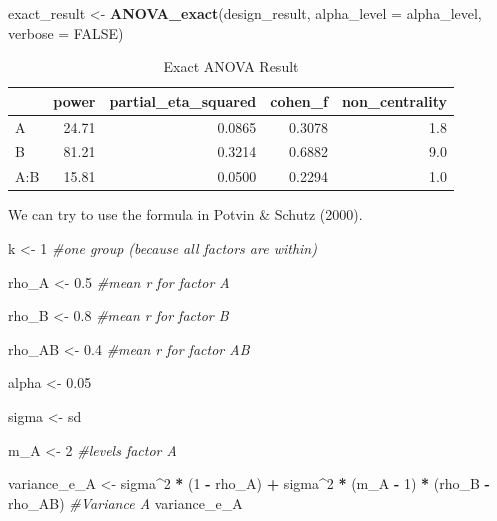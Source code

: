 \documentclass[]{book}
\newenvironment{Shaded}{\begin{snugshade}}{\end{snugshade}}
\newcommand{\CommentTok}[1]{\textcolor[rgb]{0.56,0.35,0.01}{\textit{#1}}}
\newcommand{\DataTypeTok}[1]{\textcolor[rgb]{0.13,0.29,0.53}{#1}}
\newcommand{\DecValTok}[1]{\textcolor[rgb]{0.00,0.00,0.81}{#1}}
\newcommand{\FloatTok}[1]{\textcolor[rgb]{0.00,0.00,0.81}{#1}}
\newcommand{\KeywordTok}[1]{\textcolor[rgb]{0.13,0.29,0.53}{\textbf{#1}}}
\newcommand{\NormalTok}[1]{#1}
\newcommand{\OperatorTok}[1]{\textcolor[rgb]{0.81,0.36,0.00}{\textbf{#1}}}
\newcommand{\OtherTok}[1]{\textcolor[rgb]{0.56,0.35,0.01}{#1}}
\newcommand{\StringTok}[1]{\textcolor[rgb]{0.31,0.60,0.02}{#1}}
\begin{document}
\begin{Shaded}
\begin{Highlighting}[]
\NormalTok{exact_result <-}\StringTok{ }\KeywordTok{ANOVA_exact}\NormalTok{(design_result,}
                            \DataTypeTok{alpha_level =}\NormalTok{ alpha_level,}
                            \DataTypeTok{verbose =} \OtherTok{FALSE}\NormalTok{)}
\end{Highlighting}
\end{Shaded}

\begin{table}[t]

\caption{\label{tab:unnamed-chunk-126}Exact ANOVA Result}
\centering
\begin{tabular}{l|r|r|r|r}
\hline
  & power & partial\_eta\_squared & cohen\_f & non\_centrality\\
\hline
A & 24.71 & 0.0865 & 0.3078 & 1.8\\
\hline
B & 81.21 & 0.3214 & 0.6882 & 9.0\\
\hline
A:B & 15.81 & 0.0500 & 0.2294 & 1.0\\
\hline
\end{tabular}
\end{table}

We can try to use the formula in Potvin \& Schutz (2000).

\begin{Shaded}
\begin{Highlighting}[]
\NormalTok{k <-}\StringTok{ }\DecValTok{1} \CommentTok{#one group (because all factors are within)}

\NormalTok{rho_A <-}\StringTok{ }\FloatTok{0.5} \CommentTok{#mean r for factor A}

\NormalTok{rho_B <-}\StringTok{ }\FloatTok{0.8} \CommentTok{#mean r for factor B}

\NormalTok{rho_AB <-}\StringTok{ }\FloatTok{0.4} \CommentTok{#mean r for factor AB}

\NormalTok{alpha <-}\StringTok{ }\FloatTok{0.05}

\NormalTok{sigma <-}\StringTok{ }\NormalTok{sd}

\NormalTok{m_A <-}\StringTok{ }\DecValTok{2} \CommentTok{#levels factor A}

\NormalTok{variance_e_A <-}\StringTok{ }\NormalTok{sigma}\OperatorTok{^}\DecValTok{2} \OperatorTok{*}\StringTok{ }\NormalTok{(}\DecValTok{1} \OperatorTok{-}\StringTok{ }\NormalTok{rho_A) }\OperatorTok{+}\StringTok{ }
\StringTok{  }\NormalTok{sigma}\OperatorTok{^}\DecValTok{2} \OperatorTok{*}\StringTok{ }\NormalTok{(m_A }\OperatorTok{-}\StringTok{ }\DecValTok{1}\NormalTok{) }\OperatorTok{*}\StringTok{ }\NormalTok{(rho_B }\OperatorTok{-}\StringTok{ }\NormalTok{rho_AB) }
\CommentTok{#Variance A}
\NormalTok{variance_e_A}
\end{Highlighting}
\end{Shaded}
\end{document}
